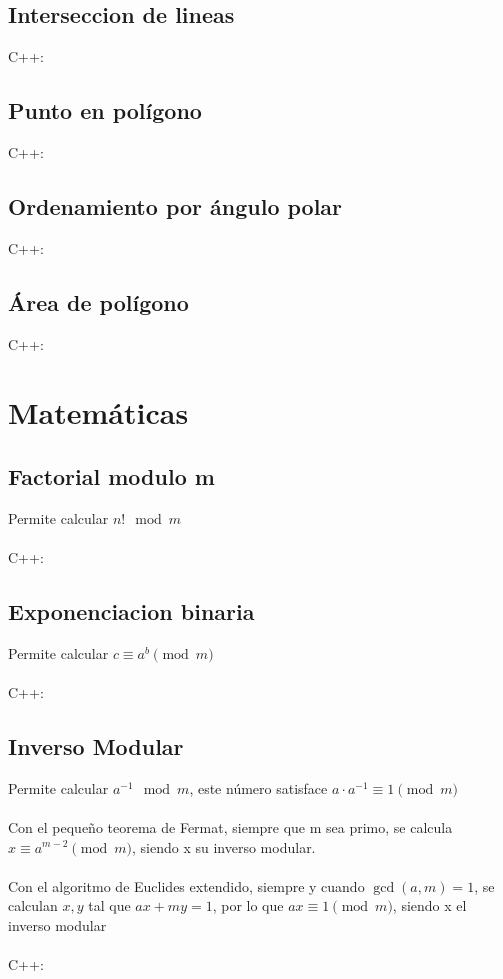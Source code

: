 \documentclass{article}
\begin{document}
    \subsection{Interseccion de lineas}
        C++:
        
    \subsection{Punto en polígono}
        C++:
        
    \subsection{Ordenamiento por ángulo polar}
        C++:
        
    \subsection{Área de polígono}
        C++:
        
      
\pagebreak
\section{Matemáticas}
    \subsection{Factorial modulo m}
        Permite calcular $n! \mod{m}$
        \\ \\
        C++:
        
    \subsection{Exponenciacion binaria}
        Permite calcular $c \equiv a^b\pmod{m}$
        \\ \\
        C++:
        

    \subsection{Inverso Modular}
        Permite calcular $ a^{-1} \mod{m}$, este número satisface $a \cdot a^{-1} \equiv 1 \pmod{m}$
        \\ \\
        Con el pequeño teorema de Fermat, siempre que m sea primo, se calcula $x \equiv a^{m - 2} \pmod{m}$, siendo x su inverso modular.
        \\ \\
        Con el algoritmo de Euclides extendido, siempre y cuando $\gcd(a, m) = 1$, se calculan $x, y$ tal que $ ax + my = 1$, por lo que
        $ax \equiv 1 \pmod{m}$, siendo x el inverso modular 
        \\ \\
        C++:
        
\end{document}
